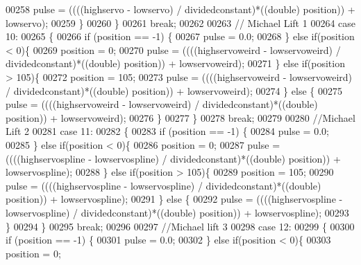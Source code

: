 \begin{DoxyCode}
00258                 pulse = ((((highservo - lowservo) / dividedconstant)*((double) position)) + lowservo);
00259             \}
00260         \}
00261             \textcolor{keywordflow}{break};
00262 
00263             \textcolor{comment}{// Michael Lift 1}
00264         \textcolor{keywordflow}{case} 10:
00265         \{
00266             \textcolor{keywordflow}{if} (position == -1) \{
00267                 pulse = 0.0;
00268             \} \textcolor{keywordflow}{else} \textcolor{keywordflow}{if}(position < 0)\{
00269                 position = 0;
00270                 pulse = ((((highservoweird - lowservoweird) / dividedconstant)*((double) position)) + 
      lowservoweird);
00271             \} \textcolor{keywordflow}{else} \textcolor{keywordflow}{if}(position > 105)\{
00272                 position = 105;
00273                 pulse = ((((highservoweird - lowservoweird) / dividedconstant)*((double) position)) + 
      lowservoweird);
00274             \} \textcolor{keywordflow}{else} \{
00275                 pulse = ((((highservoweird - lowservoweird) / dividedconstant)*((double) position)) + 
      lowservoweird);
00276             \}
00277         \}
00278             \textcolor{keywordflow}{break};
00279 
00280             \textcolor{comment}{//Michael Lift 2}
00281         \textcolor{keywordflow}{case} 11:
00282         \{
00283             \textcolor{keywordflow}{if} (position == -1) \{
00284                 pulse = 0.0;
00285             \} \textcolor{keywordflow}{else} \textcolor{keywordflow}{if}(position < 0)\{
00286                 position = 0;
00287                 pulse = ((((highservospline - lowservospline) / dividedconstant)*((double) position)) + 
      lowservospline);
00288             \} \textcolor{keywordflow}{else} \textcolor{keywordflow}{if}(position > 105)\{
00289                 position = 105;
00290                 pulse = ((((highservospline - lowservospline) / dividedconstant)*((double) position)) + 
      lowservospline);
00291             \} \textcolor{keywordflow}{else} \{
00292                 pulse = ((((highservospline - lowservospline) / dividedconstant)*((double) position)) + 
      lowservospline);
00293             \}
00294         \}
00295             \textcolor{keywordflow}{break};
00296 
00297             \textcolor{comment}{//Michael lift 3}
00298         \textcolor{keywordflow}{case} 12:
00299         \{
00300             \textcolor{keywordflow}{if} (position == -1) \{
00301                 pulse = 0.0;
00302             \} \textcolor{keywordflow}{else} \textcolor{keywordflow}{if}(position < 0)\{
00303                 position = 0;

\end{DoxyCode}
